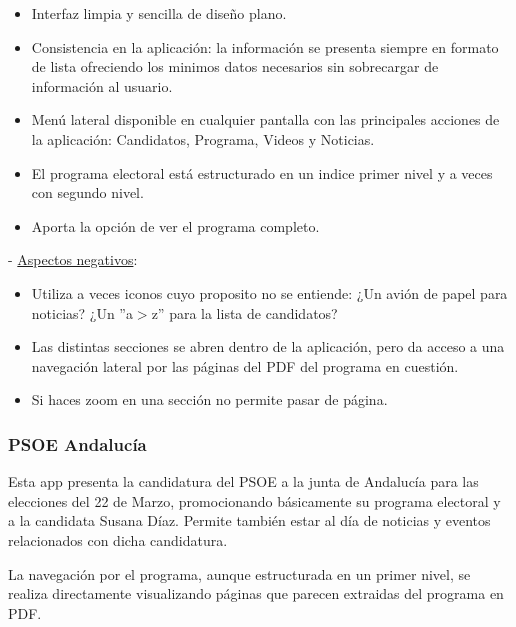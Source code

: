 \begin{itemize}
	\item Interfaz limpia y sencilla de diseño plano.
	\item Consistencia en la aplicación: la información se presenta siempre en formato de lista ofreciendo los minimos datos necesarios sin sobrecargar de información al usuario.
	\item Menú lateral disponible en cualquier pantalla con las principales acciones de la aplicación: Candidatos, Programa, Videos y Noticias.
	\item El programa electoral está estructurado en un indice primer nivel y a veces con segundo nivel.
	\item Aporta la opción de ver el programa completo. 
\end{itemize}

 - \underline{Aspectos negativos}:

\begin{itemize}
	\item Utiliza a veces iconos cuyo proposito no se entiende: ¿Un avión de papel para noticias? ¿Un ''a$>$z'' para la lista de candidatos?
	\item Las distintas secciones se abren dentro de la aplicación, pero da acceso a una navegación lateral por las páginas del PDF del programa en cuestión.
	\item Si haces zoom en una sección no permite pasar de página.
\end{itemize}

\subsubsection{PSOE Andalucía}

Esta app presenta la candidatura del PSOE a la junta de Andalucía para las elecciones del 22 de Marzo, promocionando básicamente su programa electoral y a la candidata Susana Díaz. Permite también estar al día de noticias y eventos relacionados con dicha candidatura.

La navegación por el programa, aunque estructurada en un primer nivel, se realiza directamente visualizando páginas que parecen extraidas del programa en PDF.

